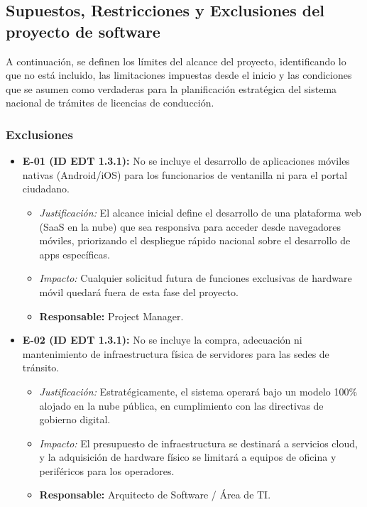 \subsection{Supuestos, Restricciones y Exclusiones del proyecto de software}

A continuación, se definen los límites del alcance del proyecto, identificando lo que no está incluido, las limitaciones impuestas desde el inicio y las condiciones que se asumen como verdaderas para la planificación estratégica del sistema nacional de trámites de licencias de conducción.

\subsubsection{Exclusiones}

\begin{itemize}
    \item \textbf{E-01 (ID EDT 1.3.1):} No se incluye el desarrollo de aplicaciones móviles nativas (Android/iOS) para los funcionarios de ventanilla ni para el portal ciudadano.
    \begin{itemize}
        \item \textit{Justificación:} El alcance inicial define el desarrollo de una plataforma web (SaaS en la nube) que sea responsiva para acceder desde navegadores móviles, priorizando el despliegue rápido nacional sobre el desarrollo de apps específicas.
        \item \textit{Impacto:} Cualquier solicitud futura de funciones exclusivas de hardware móvil quedará fuera de esta fase del proyecto.
        \item \textbf{Responsable:} Project Manager.
    \end{itemize}

    \item \textbf{E-02 (ID EDT 1.3.1):} No se incluye la compra, adecuación ni mantenimiento de infraestructura física de servidores para las sedes de tránsito.
    \begin{itemize}
        \item \textit{Justificación:} Estratégicamente, el sistema operará bajo un modelo 100\% alojado en la nube pública, en cumplimiento con las directivas de gobierno digital.
        \item \textit{Impacto:} El presupuesto de infraestructura se destinará a servicios cloud, y la adquisición de hardware físico se limitará a equipos de oficina y periféricos para los operadores.
        \item \textbf{Responsable:} Arquitecto de Software / Área de TI.
    \end{itemize}


\end{itemize}

